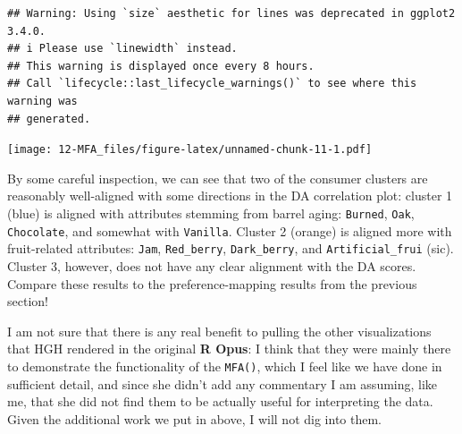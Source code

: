 \documentclass[
]{book}
\newenvironment{Shaded}{\begin{snugshade}}{\end{snugshade}}
\newcommand{\AttributeTok}[1]{\textcolor[rgb]{0.13,0.29,0.53}{#1}}
\newcommand{\ConstantTok}[1]{\textcolor[rgb]{0.56,0.35,0.01}{#1}}
\newcommand{\DecValTok}[1]{\textcolor[rgb]{0.00,0.00,0.81}{#1}}
\newcommand{\FunctionTok}[1]{\textcolor[rgb]{0.13,0.29,0.53}{\textbf{#1}}}
\newcommand{\NormalTok}[1]{#1}
\newcommand{\SpecialCharTok}[1]{\textcolor[rgb]{0.81,0.36,0.00}{\textbf{#1}}}
\newcommand{\StringTok}[1]{\textcolor[rgb]{0.31,0.60,0.02}{#1}}
\begin{document}
\begin{Shaded}
\end{Shaded}

\begin{verbatim}
## Warning: Using `size` aesthetic for lines was deprecated in ggplot2 3.4.0.
## i Please use `linewidth` instead.
## This warning is displayed once every 8 hours.
## Call `lifecycle::last_lifecycle_warnings()` to see where this warning was
## generated.
\end{verbatim}

\texttt{[image: 12-MFA\_files/figure-latex/unnamed-chunk-11-1.pdf]}

By some careful inspection, we can see that two of the consumer clusters are reasonably well-aligned with some directions in the DA correlation plot: cluster 1 (blue) is aligned with attributes stemming from barrel aging: \texttt{Burned}, \texttt{Oak}, \texttt{Chocolate}, and somewhat with \texttt{Vanilla}. Cluster 2 (orange) is aligned more with fruit-related attributes: \texttt{Jam}, \texttt{Red\_berry}, \texttt{Dark\_berry}, and \texttt{Artificial\_frui} (sic). Cluster 3, however, does not have any clear alignment with the DA scores. Compare these results to the preference-mapping results from the previous section!

I am not sure that there is any real benefit to pulling the other visualizations that HGH rendered in the original \textbf{R Opus}: I think that they were mainly there to demonstrate the functionality of the \texttt{MFA()}, which I feel like we have done in sufficient detail, and since she didn't add any commentary I am assuming, like me, that she did not find them to be actually useful for interpreting the data. Given the additional work we put in above, I will not dig into them.
\end{document}
